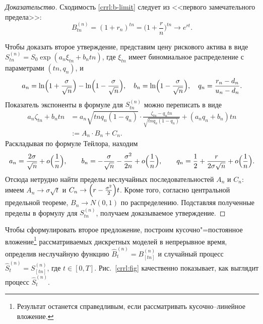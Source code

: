 \begin{proof}[Доказательство]
Сходимость \eqref{crrl:b-limit} следует из <<первого замечательного предела>>:
\[
B^{(n)}_{tn} = (1+r_n)^{tn} = \biggl(1 + \frac rn\biggr)^{tn} \to e^{rt}.
\]

Чтобы доказать второе утверждение, представим цену рискового актива в виде $S^{(n)}_{tn} = S_0\exp( a_n \xi_{tn} + b_n tn)$,
где $\xi_{tn}$ имеет биномиальное распределение с параметрами $(tn, q_n)$, и
\[
a_n = \ln \Bigl(1 + \frac{\sigma}{\sqrt n}\Bigr) 
  - \ln\Bigl(1 - \frac\sigma{\sqrt n}\Bigr), \quad
b_n = \ln \Bigl(1-\frac{\sigma}{\sqrt n}\Bigr),\quad 
q_n = \frac{r_n-d_n}{u_n-d_n}.
\]
Показатель экспоненты в формуле для $S_{tn}^{(n)}$ можно переписать в виде
\[
\begin{split}
a_n\zeta_{tn} + b_ntn &= a_n\sqrt{tnq_n(1-q_n)}\cdot \frac{\zeta_{tn} - q_n tn}{\sqrt{ tnq_n(1-q_n)}} + (a_nq_n +b_n)tn \\
&:= A_n\cdot B_n + C_n.
\end{split}
\]
Раскладывая по формуле Тейлора, находим
\[
a_n = \frac{2\sigma}{\sqrt n} + o\Bigl(\frac1n\Bigr), \qquad
b_n = -\frac{\sigma}{\sqrt n} - \frac{\sigma^2}{2n}+ o\Bigl(\frac1n\Bigr),\qquad
q_n = \frac 12 + \frac{r}{2\sigma\sqrt n}+ o\Bigl(\frac1n\Bigr).
\]
Отсюда нетрудно найти пределы неслучайных последовательностей $A_n$ и $C_n$: имеем $A_n \to \sigma \sqrt t$ и $C_n \to \Bigl(r - \frac{\sigma^2}{2}\Bigr)t$.
Кроме того, согласно центральной предельной теореме, $B_n \to N(0,1)$ по распределению.
Подставляя полученные пределы в формулу для $S_{tn}^{(n)}$, получаем доказываемое утверждение.
\end{proof}

Чтобы сформулировать второе предложение, построим кусочно"=постоянное вложение\footnote{Результат останется справедливым, если рассматривать кусочно--линейное вложение.} рассматриваемых дискретных моделей в непрерывное время, определив неслучайную функцию $\hat B_t^{(n)} = B_{[tn]}^{(n)}$ и случайный процесс $\hat S_t^{(n)} = S_{[tn]}^{(n)}$, где $t\in[0,T]$. Рис.~\ref{crrl:fig} качественно показывает, как выглядит процесс $\hat S_t^{(n)}$.

